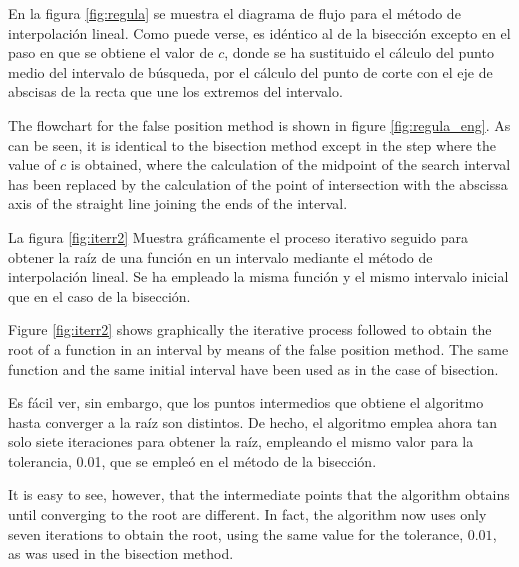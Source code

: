 \begin{paracol}{2}
En la figura \ref{fig:regula} se muestra el diagrama de flujo para el método de interpolación lineal. Como puede verse, es idéntico al de la bisección excepto en el paso en que se obtiene el valor de $c$, donde se ha sustituido el cálculo del punto medio del intervalo de búsqueda, por el cálculo del punto de corte con el eje de abscisas  de la recta que une los extremos del intervalo.

\switchcolumn
The flowchart for the false position method is shown in figure \ref{fig:regula_eng}. As can be seen, it is identical to the bisection method except in the step where the value of $c$ is obtained, where the calculation of the midpoint of the search interval has been replaced by the calculation of the point of intersection with the abscissa axis of the straight line joining the ends of the interval.
\switchcolumn

La figura \ref{fig:iterr2} Muestra gráficamente el proceso iterativo seguido para obtener la raíz de una función en un intervalo mediante el método de interpolación lineal. Se ha empleado la misma función y el mismo intervalo inicial que en el caso de la bisección. 
\switchcolumn

Figure \ref{fig:iterr2} shows graphically the iterative process followed to obtain the root of a function in an interval by means of the false position method. The same function and the same initial interval have been used as in the case of bisection. 
\switchcolumn

Es fácil ver, sin embargo, que los puntos intermedios que obtiene el algoritmo hasta converger a la raíz son distintos. De hecho, el algoritmo emplea ahora tan solo siete iteraciones para obtener la raíz, empleando el mismo valor para la tolerancia, 0.01, que se empleó en el método de la bisección.
\switchcolumn


It is easy to see, however, that the intermediate points that the algorithm obtains until converging to the root are different. In fact, the algorithm now uses only seven iterations to obtain the root, using the same value for the tolerance, $0.01$, as was used in the bisection method.
\end{paracol}


